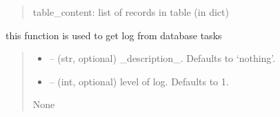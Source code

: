 \documentclass[letterpaper,10pt,english]{sphinxmanual}
\begin{document}
\begin{savenotes}
\begin{fulllineitems}
\begin{savenotes}
\begin{fulllineitems}
\begin{quote}
\begin{description}
\sphinxAtStartPar
table\_content: list of records in table (in dict)

\end{description}\end{quote}

\end{fulllineitems}\end{savenotes}


\begin{savenotes}\begin{fulllineitems}
\label{\detokenize{setting/database:oxin.database.dataBase.get_col_name}}
\pysigstartsignatures
{}
\pysigstopsignatures
\end{fulllineitems}\end{savenotes}


\begin{savenotes}\begin{fulllineitems}
\label{\detokenize{setting/database:oxin.database.dataBase.get_log}}
\pysigstartsignatures
{}
\pysigstopsignatures
\sphinxAtStartPar
this function is used to get log from database tasks
\begin{quote}\begin{description}
\begin{itemize}
\item {} 
\sphinxAtStartPar
{} – (str, optional) \_description\_. Defaults to ‘nothing’.

\item {} 
\sphinxAtStartPar
{} – (int, optional) level of log. Defaults to 1.

\end{itemize}

\sphinxAtStartPar
None


\end{description}
\end{quote}
\end{fulllineitems}
\end{savenotes}
\end{fulllineitems}
\end{savenotes}
\end{document}
